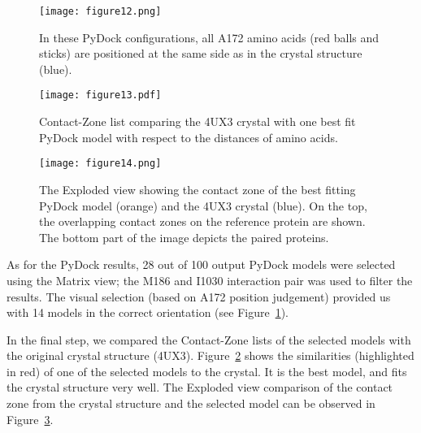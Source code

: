 \documentclass[twocolumn]{bmcart}%
\def\ExpView {Exploded view\xspace}
\def\MatView {Matrix view\xspace}
\def\CoZoList{Contact-Zone list\xspace}
\def\CoZoLists{Contact-Zone lists\xspace}
\begin{document}
\begin{figure}[tb]
  \centering
  \texttt{[image: figure12.png]}
  \caption{ In these PyDock configurations, all A172 amino acids (red balls and sticks) are positioned at the same side as in the crystal structure (blue).}
  \label{fig:selection2SMC3PyDock}
\end{figure}

\begin{figure}[!h]
    \centering
  \texttt{[image: figure13.pdf]}
	\vspace{-5pt}
    \caption{ \CoZoList comparing the 4UX3 crystal with one best fit PyDock model with respect to the distances of amino acids.}
  \label{fig:coiled2}    
\end{figure}

\begin{figure}[!hb]
  \centering
  \texttt{[image: figure14.png]}
  \vspace{-5pt}
  \caption{ The \ExpView showing the contact zone of the best fitting PyDock model (orange) and the 4UX3 crystal (blue). On the top, the overlapping contact zones on the reference protein are shown. The bottom part of the image depicts the paired proteins.}
  \label{fig:selection_4_final_SMC3_PyDock}
  \end{figure}

As for the PyDock results, 28 out of 100 output PyDock models were selected using the \MatView; the M186 and I1030 interaction pair was used to filter the results.
The visual selection (based on A172 position judgement) provided us with 14 models in the correct orientation (see Figure~\ref{fig:selection2SMC3PyDock}).

In the final step, we compared the \CoZoLists of the selected models with the original crystal structure (4UX3). 
Figure~\ref{fig:coiled2} shows the similarities (highlighted in red) of one of the selected models to the crystal. It is the best model, and fits the crystal structure very well. The \ExpView comparison of the contact zone from the crystal structure and the selected model can be observed in Figure~\ref{fig:selection_4_final_SMC3_PyDock}.
\end{document}
